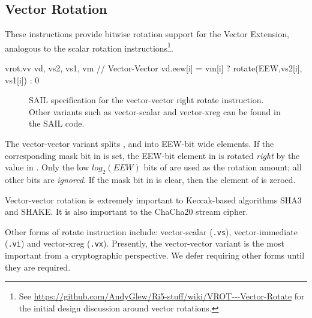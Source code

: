 \clearpage
\subsection{Vector Rotation}

These instructions provide bitwise rotation support for the
Vector Extension, analogous to the scalar rotation instructions\footnote{
See \url{https://github.com/AndyGlew/Ri5-stuff/wiki/VROT---Vector-Rotate}
for the initial design discussion around vector rotations.
}.

\begin{cryptoisa}
vrot.vv     vd, vs2, vs1, vm        // Vector-Vector
    vd.eew[i] = vm[i] ? rotate(EEW,vs2[i], vs1[i]) : 0
\end{cryptoisa}

\begin{figure}[h]

\caption{
SAIL specification for the vector-vector right rotate instruction.
Other variants such as vector-scalar and vector-xreg can be found in
the SAIL code.
}
\label{fig:sail:vrot}
\end{figure}

The vector-vector variant splits \vrd,  and  into
EEW-bit wide elements.
If the corresponding mask bit in \vm is set,
the EEW-bit element in  is rotated
{\em right} by the value in .
Only the low $log_2(EEW)$ bits of  are used as the rotation
amount; all other bits are {\em ignored}.
If the mask bit in \vm is clear, then the element of \vrd is zeroed.


Vector-vector rotation is extremely important to Keccak-based algorithms 
SHA3 and SHAKE.
It is also important to the ChaCha20 stream cipher.

Other forms of rotate instruction include:
vector-scalar (\texttt{.vs}),
vector-immediate (\texttt{.vi})
and
vector-xreg (\texttt{.vx}).
Presently, the vector-vector variant is the most important from a
cryptographic perspective.
We defer requiring other forms until they are required.
